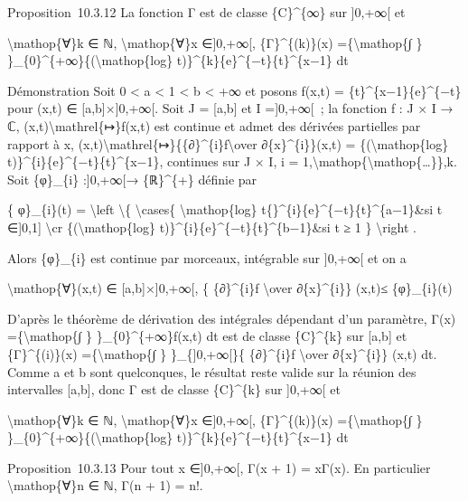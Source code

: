 \documentclass[]{article}
\begin{document}
Proposition~10.3.12 La fonction Γ est de classe \{C\}\^{}\{∞\} sur
{]}0,+∞{[} et

\textbackslash{}mathop\{∀\}k ∈ ℕ, \textbackslash{}mathop\{∀\}x
∈{]}0,+∞{[}, \{Γ\}\^{}\{(k)\}(x) =\{\textbackslash{}mathop\{∫ \}
\}\_\{0\}\^{}\{+∞\}\{(\textbackslash{}mathop\{log\}
t)\}\^{}\{k\}\{e\}\^{}\{−t\}\{t\}\^{}\{x−1\} dt

Démonstration Soit 0 \textless{} a \textless{} 1 \textless{} b
\textless{} +∞ et posons f(x,t) = \{t\}\^{}\{x−1\}\{e\}\^{}\{−t\} pour
(x,t) ∈ {[}a,b{]}×{]}0,+∞{[}. Soit J = {[}a,b{]} et I ={]}0,+∞{[}~; la
fonction f : J × I → ℂ, (x,t)\textbackslash{}mathrel\{↦\}f(x,t) est
continue et admet des dérivées partielles par rapport à x,
(x,t)\textbackslash{}mathrel\{↦\}\{\{∂\}\^{}\{i\}f\textbackslash{}over
∂\{x\}\^{}\{i\}\}(x,t) = \{(\textbackslash{}mathop\{log\}
t)\}\^{}\{i\}\{e\}\^{}\{−t\}\{t\}\^{}\{x−1\}, continues sur J × I, i =
1,\textbackslash{}mathop\{\textbackslash{}mathop\{\ldots{}\}\},k. Soit
\{φ\}\_\{i\} :{]}0,+∞{[}→ \{ℝ\}\^{}\{+\} définie par

\{ φ\}\_\{i\}(t) = \textbackslash{}left \textbackslash{}\{
\textbackslash{}cases\{ \textbar{}\textbackslash{}mathop\{log\}
t\{\textbar{}\}\^{}\{i\}\{e\}\^{}\{−t\}\{t\}\^{}\{a−1\}\&si t ∈{]}0,1{]}
\textbackslash{}cr \{(\textbackslash{}mathop\{log\}
t)\}\^{}\{i\}\{e\}\^{}\{−t\}\{t\}\^{}\{b−1\}\&si t ≥ 1 \}
\textbackslash{}right .

Alors \{φ\}\_\{i\} est continue par morceaux, intégrable sur {]}0,+∞{[}
et on a

\textbackslash{}mathop\{∀\}(x,t) ∈ {[}a,b{]}×{]}0,+∞{[}, \textbar{}\{
\{∂\}\^{}\{i\}f \textbackslash{}over ∂\{x\}\^{}\{i\}\} (x,t)\textbar{}≤
\{φ\}\_\{i\}(t)

D'après le théorème de dérivation des intégrales dépendant d'un
paramètre, Γ(x) =\{\textbackslash{}mathop\{∫ \}
\}\_\{0\}\^{}\{+∞\}f(x,t) dt est de classe \{C\}\^{}\{k\} sur {[}a,b{]}
et \{Γ\}\^{}\{(i)\}(x) =\{\textbackslash{}mathop\{∫ \}
\}\_\{{]}0,+∞{[}\}\{ \{∂\}\^{}\{i\}f \textbackslash{}over
∂\{x\}\^{}\{i\}\} (x,t) dt. Comme a et b sont quelconques, le résultat
reste valide sur la réunion des intervalles {[}a,b{]}, donc Γ est de
classe \{C\}\^{}\{k\} sur {]}0,+∞{[} et

\textbackslash{}mathop\{∀\}k ∈ ℕ, \textbackslash{}mathop\{∀\}x
∈{]}0,+∞{[}, \{Γ\}\^{}\{(k)\}(x) =\{\textbackslash{}mathop\{∫ \}
\}\_\{0\}\^{}\{+∞\}\{(\textbackslash{}mathop\{log\}
t)\}\^{}\{k\}\{e\}\^{}\{−t\}\{t\}\^{}\{x−1\} dt

Proposition~10.3.13 Pour tout x ∈{]}0,+∞{[}, Γ(x + 1) = xΓ(x). En
particulier \textbackslash{}mathop\{∀\}n ∈ ℕ, Γ(n + 1) = n!.
\end{document}
